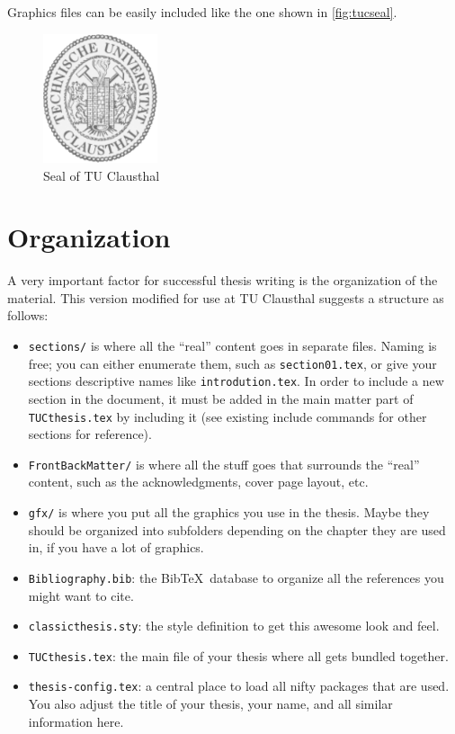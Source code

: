 Graphics files can be easily included like the one shown in \autoref{fig:tucseal}.

\begin{figure}[h]
\myfloatalign
\includegraphics[width=0.3\textwidth]{gfx/TUC-seal.pdf}
\caption{Seal of TU Clausthal}
\label{fig:tucseal}
\end{figure}


\section{Organization}
A very important factor for successful thesis writing is the
organization of the material. This version modified for use at TU Clausthal  
suggests a structure as follows:
\begin{itemize}
    \item\texttt{sections/} is where all the ``real'' content goes in
    separate files. Naming is free; you can either enumerate them, such as \texttt{section01.tex}, or
    give your sections descriptive names like \texttt{introdution.tex}. In order to include
    a new section in the document, it must be added in the main matter part of \texttt{TUCthesis.tex}
    by including it (see existing include commands for other sections for reference).

    \item\texttt{FrontBackMatter/} is where all the stuff goes that
    surrounds the ``real'' content, such as the acknowledgments,
    cover page layout, etc.
    
    \item\texttt{gfx/} is where you put all the graphics you use in
    the thesis. Maybe they should be organized into subfolders
    depending on the chapter they are used in, if you have a lot of
    graphics.
    
    \item\texttt{Bibliography.bib}: the Bib\TeX\ database to organize
    all the references you might want to cite.
    
    \item\texttt{classicthesis.sty}: the style definition to get this
    awesome look and feel. 
    
    \item\texttt{TUCthesis.tex}: the main file of your thesis
    where all gets bundled together.
    
    \item\texttt{thesis-config.tex}: a central place to load all 
    nifty packages that are used. You also adjust the title of your thesis, 
    your name, and all  similar information here. 
    
\end{itemize}


